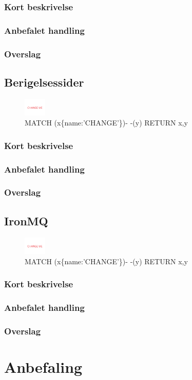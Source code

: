 \documentclass{article}
\begin{document}
\subsubsection{Kort beskrivelse}
\subsubsection{Anbefalet handling}
\subsubsection{Overslag}


\subsection{Berigelsessider}
\begin{figure}[h]
\includegraphics[width=30pt]{CHANGE.PNG}
\caption{MATCH (x\{name:'CHANGE'\})- -(y) RETURN x,y}
\end{figure}
\subsubsection{Kort beskrivelse}
\subsubsection{Anbefalet handling}
\subsubsection{Overslag}


\subsection{IronMQ}
\begin{figure}[h]
\includegraphics[width=30pt]{CHANGE.PNG}
\caption{MATCH (x\{name:'CHANGE'\})- -(y) RETURN x,y}
\end{figure}
\subsubsection{Kort beskrivelse}
\subsubsection{Anbefalet handling}
\subsubsection{Overslag}


\section{Anbefaling}

\end{document}
